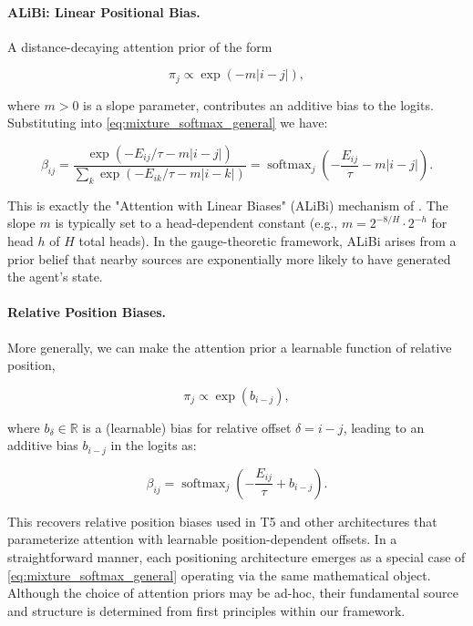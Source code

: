 \documentclass[twoside,11pt]{article}
\begin{document}
\paragraph{ALiBi: Linear Positional Bias.}

A distance-decaying attention prior of the form

\begin{equation}
\pi_j \propto \exp(-m|i - j|),
\label{eq:alibi_prior}
\end{equation}

where $m > 0$ is a slope parameter, contributes an additive bias to the logits. Substituting into \eqref{eq:mixture_softmax_general} we have:

\begin{equation}
\beta_{ij} = \frac{\exp(-E_{ij}/\tau - m|i-j|)}{\sum_k \exp(-E_{ik}/\tau - m|i-k|)} = \operatorname{softmax}_j \left(-\frac{E_{ij}}{\tau} - m|i - j|\right).
\label{eq:alibi_attention}
\end{equation}

This is exactly the "Attention with Linear Biases" (ALiBi) mechanism of \citet{press2022train}. The slope $m$ is typically set to a head-dependent constant (e.g., $m = 2^{-8/H} \cdot 2^{-h}$ for head $h$ of $H$ total heads). In the gauge-theoretic framework, ALiBi arises from a prior belief that nearby sources are exponentially more likely to have generated the agent's state.

\paragraph{Relative Position Biases.}
More generally, we can make the attention prior a learnable function of relative position,

\begin{equation}
\pi_j \propto \exp(b_{i-j}),
\label{eq:relative_bias_prior}
\end{equation}

where $b_\delta \in \mathbb{R}$ is a (learnable) bias for relative offset $\delta = i - j$, leading to an additive bias $b_{i-j}$ in the logits as:

\begin{equation}
\beta_{ij} = \operatorname{softmax}_j \left(-\frac{E_{ij}}{\tau} + b_{i-j}\right).
\label{eq:relative_bias_attention}
\end{equation}

This recovers relative position biases used in T5 \citep{raffel2020exploring} and other architectures that parameterize attention with learnable position-dependent offsets. In a straightforward manner, each positioning architecture emerges as a special case of \eqref{eq:mixture_softmax_general} operating via the same mathematical object. Although the choice of attention priors may be ad-hoc, their fundamental source and structure is determined from first principles within our framework.
\end{document}
